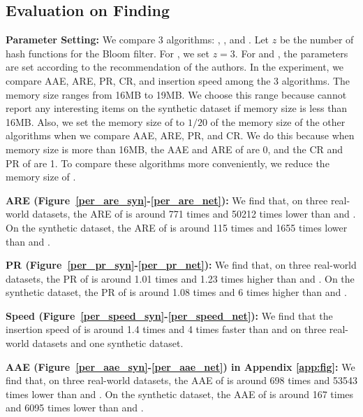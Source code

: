 \presub %
\subsection{Evaluation on Finding \taskthree} %
\label{eva_three}

\noindent\textbf{Parameter Setting:}
%
%
We compare 3 algorithms: \sketchname, \perpie\cite{persisitem}, and \perss\cite{smallspace}.
Let $z$ be the number of hash functions for the Bloom filter. For \sketchname{}, we set $z=3$.
For \perpie{} and \perss, the parameters are set according to the recommendation of the authors.
In the experiment, we compare AAE, ARE, PR, CR, and insertion speed among the 3 algorithms.
The memory size ranges from 16MB to 19MB. We choose this range because \perpie{} cannot report any interesting items on the synthetic dataset if memory size is less than 16MB. Also, we set the memory size of \sketchname{} to $1/20$ of the memory size of the other algorithms when we compare AAE, ARE, PR, and CR. 
We do this because when memory size is more than 16MB, the AAE and ARE of \sketchname{} are 0, and the CR and PR of \sketchname{} are 1. To compare these algorithms more conveniently, we reduce the memory size of \sketchname.
			
			
\noindent\textbf{ARE (Figure~\ref{per_are_syn}-\ref{per_are_net}):}
We find that, on three real-world datasets, the ARE of \sketchname{} is around 771 times and 50212 times lower than \perss{} and \perpie. On the synthetic dataset, the ARE of \sketchname{} is around 115 times and 1655 times lower than \perss{} and \perpie.  


\noindent\textbf{PR (Figure~\ref{per_pr_syn}-\ref{per_pr_net}):}
We find that, on three real-world datasets, the PR of \sketchname{} is around 1.01 times and 1.23 times higher than \perss{} and \perpie. On the synthetic dataset, the PR of \sketchname{} is around 1.08 times and 6 times higher than \perss{} and \perpie.  
			
			
\noindent\textbf{Speed (Figure~\ref{per_speed_syn}-\ref{per_speed_net}):}
We find that the insertion speed of \sketchname{} is around 1.4 times and 4 times faster than \perss{} and \perpie{} on three real-world datasets and one synthetic dataset.

\noindent\textbf{AAE (Figure~\ref{per_aae_syn}-\ref{per_aae_net}) in Appendix \ref{app:fig}:}
We find that, on three real-world datasets, the AAE of \sketchname{} is around 698 times and 53543 times lower than \perss{} and \perpie. On the synthetic dataset, the AAE of \sketchname{} is around 167 times and 6095 times lower than \perss{} and \perpie. 

